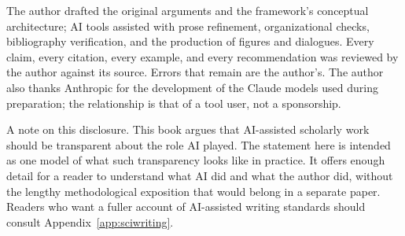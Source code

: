 \documentclass{SIAMbook2023}
\begin{document}
The author drafted the original arguments and the framework's conceptual architecture; AI tools assisted with prose refinement, organizational checks, bibliography verification, and the production of figures and dialogues. Every claim, every citation, every example, and every recommendation was reviewed by the author against its source. Errors that remain are the author's. The author also thanks Anthropic for the development of the Claude models used during preparation; the relationship is that of a tool user, not a sponsorship.




A note on this disclosure. This book argues that AI-assisted scholarly work should be transparent about the role AI played. The statement here is intended as one model of what such transparency looks like in practice. It offers enough detail for a reader to understand what AI did and what the author did, without the lengthy methodological exposition that would belong in a separate paper. Readers who want a fuller account of AI-assisted writing standards should consult Appendix~\ref{app:sciwriting}.



\newpage



\backmatter



\cleardoublepage
\printindex
\end{document}
